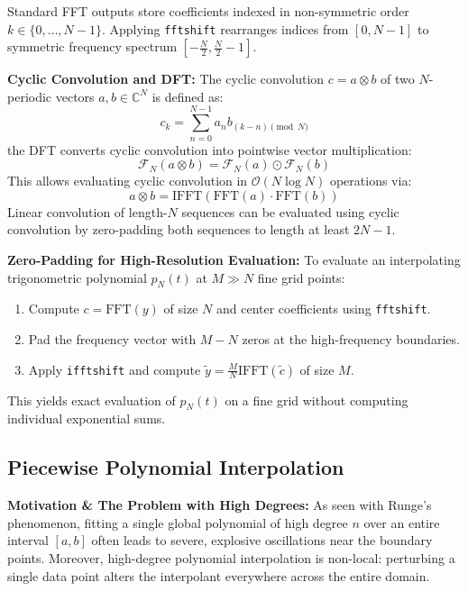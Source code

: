 \begin{remark}
    Standard FFT outputs store coefficients indexed in non-symmetric order $k \in \{0, \dots, N-1\}$. Applying \texttt{fftshift} rearranges indices from $[0, N-1]$ to symmetric frequency spectrum $[-\frac{N}{2}, \frac{N}{2}-1]$.
\end{remark}

\begin{example}
    \textbf{Cyclic Convolution and DFT:} The cyclic convolution $c = a \otimes b$ of two $N$-periodic vectors $a, b \in \mathbb{C}^N$ is defined as:
    $$c_k = \sum_{n=0}^{N-1} a_n b_{(k-n) \pmod N}$$
    the DFT converts cyclic convolution into pointwise vector multiplication:
    $$\mathcal{F}_N(a \otimes b) = \mathcal{F}_N(a) \odot \mathcal{F}_N(b)$$
    This allows evaluating cyclic convolution in $\mathcal{O}(N \log N)$ operations via:
    $$a \otimes b = \text{IFFT}(\text{FFT}(a) \cdot \text{FFT}(b))$$
    Linear convolution of length-$N$ sequences can be evaluated using cyclic convolution by zero-padding both sequences to length at least $2N-1$.
\end{example}

\begin{theorem}
    \textbf{Zero-Padding for High-Resolution Evaluation:} To evaluate an interpolating trigonometric polynomial $p_N(t)$ at $M \gg N$ fine grid points:
    \begin{enumerate}
        \item Compute $c = \text{FFT}(y)$ of size $N$ and center coefficients using \texttt{fftshift}.
        \item Pad the frequency vector with $M - N$ zeros at the high-frequency boundaries.
        \item Apply \texttt{ifftshift} and compute $\tilde{y} = \frac{M}{N} \text{IFFT}(\tilde{c})$ of size $M$.
    \end{enumerate}
    This yields exact evaluation of $p_N(t)$ on a fine grid without computing individual exponential sums.
\end{theorem}

\subsection{Piecewise Polynomial Interpolation}

\begin{remark}
    \textbf{Motivation \& The Problem with High Degrees:} As seen with Runge's phenomenon, fitting a single global polynomial of high degree $n$ over an entire interval $[a,b]$ often leads to severe, explosive oscillations near the boundary points. Moreover, high-degree polynomial interpolation is non-local: perturbing a single data point alters the interpolant everywhere across the entire domain.
\end{remark}

